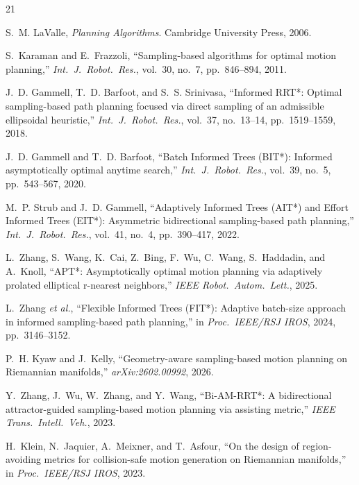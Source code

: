 \documentclass[journal]{IEEEtran}
\begin{document}
\balance

\begin{thebibliography}{21}

S.~M. LaValle, \emph{Planning Algorithms}.
Cambridge University Press, 2006.

S.~Karaman and E.~Frazzoli,
``Sampling-based algorithms for optimal motion planning,''
\emph{Int.\ J.\ Robot.\ Res.}, vol.~30, no.~7, pp.~846--894, 2011.

J.~D. Gammell, T.~D. Barfoot, and S.~S. Srinivasa,
``Informed RRT*: Optimal sampling-based path planning focused via
direct sampling of an admissible ellipsoidal heuristic,''
\emph{Int.\ J.\ Robot.\ Res.}, vol.~37, no.~13--14, pp.~1519--1559, 2018.

J.~D. Gammell and T.~D. Barfoot,
``Batch Informed Trees (BIT*): Informed asymptotically optimal
anytime search,''
\emph{Int.\ J.\ Robot.\ Res.}, vol.~39, no.~5, pp.~543--567, 2020.

M.~P. Strub and J.~D. Gammell,
``Adaptively Informed Trees (AIT*) and Effort Informed Trees (EIT*):
Asymmetric bidirectional sampling-based path planning,''
\emph{Int.\ J.\ Robot.\ Res.}, vol.~41, no.~4, pp.~390--417, 2022.

L.~Zhang, S.~Wang, K.~Cai, Z.~Bing, F.~Wu, C.~Wang, S.~Haddadin,
and A.~Knoll,
``APT*: Asymptotically optimal motion planning via adaptively
prolated elliptical r-nearest neighbors,''
\emph{IEEE Robot.\ Autom.\ Lett.}, 2025.

L.~Zhang \emph{et al.},
``Flexible Informed Trees (FIT*): Adaptive batch-size approach in
informed sampling-based path planning,''
in \emph{Proc.\ IEEE/RSJ IROS}, 2024, pp.~3146--3152.

P.~H. Kyaw and J.~Kelly,
``Geometry-aware sampling-based motion planning on Riemannian
manifolds,''
\emph{arXiv:2602.00992}, 2026.

Y.~Zhang, J.~Wu, W.~Zhang, and Y.~Wang,
``Bi-AM-RRT*: A bidirectional attractor-guided sampling-based motion
planning via assisting metric,''
\emph{IEEE Trans.\ Intell.\ Veh.}, 2023.

H.~Klein, N.~Jaquier, A.~Meixner, and T.~Asfour,
``On the design of region-avoiding metrics for collision-safe motion
generation on Riemannian manifolds,''
in \emph{Proc.\ IEEE/RSJ IROS}, 2023.


\end{thebibliography}
\end{document}
